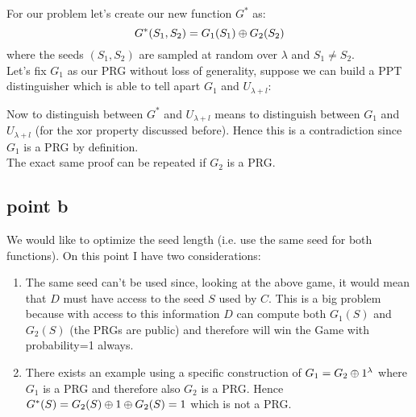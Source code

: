 \documentclass[11pt]{article}
\newcounter{t0d0_counter}
\begin{document}
For our problem let's create our new function $G^*$ as: 
$$G^{*}(S_1, S_2)=G_{1}(S_1) \oplus G_{2}(S_2)$$
where the seeds $(S_1, S_2) $ are sampled at random over $\lambda$ and $S_1 \neq S_2$.\\

Let's fix $G_{1}$ as our PRG without loss of generality, suppose we can build a PPT distinguisher which is able to tell apart $G_1$ and $U_{\lambda+l}$:

\begin{figure}[h!]
   \centering
   \sdinit{}
\end{figure}

Now to distinguish between $G^*$ and $U_{\lambda+l}$ means to distinguish between $G_1$ and $U_{\lambda+l}$ (for the xor property discussed before). Hence this is a contradiction since $G_1$ is a PRG by definition. \\ 
The exact same proof can be repeated if $G_{2}$ is a PRG.

\newpage
\subsection{point b}

We would like to optimize the seed length (i.e. use the same seed for both functions). On this point I have two considerations:
\begin{enumerate}
   \item The same seed can't be used since, looking at the above game, it would mean that $D$ must have access to the seed $S$ used by $C$. This is a big problem because with access to this information $D$ can compute both $G_1(S)$ and $G_2(S)$ (the PRGs are public) and therefore will win the Game with probability=1 always.
   \item There exists an example using a specific construction of $G_{1}=G_{2} \oplus 1^{\lambda} $ where $G_1$ is a PRG and therefore also $G_2$ is a PRG.
   Hence $G^{*}(S)= G_{2}(S) \oplus 1 \oplus G_{2}(S) = 1$ which is not a PRG. 
\end{enumerate}
\end{document}

